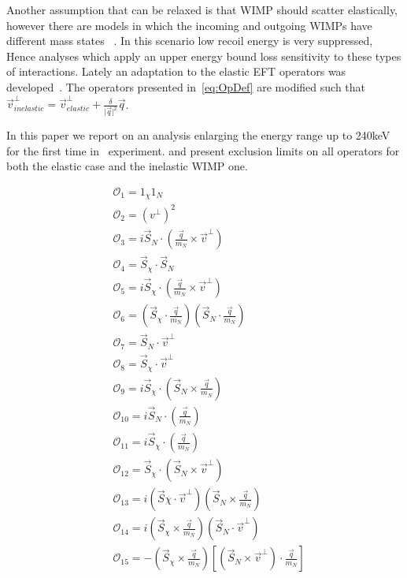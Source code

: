	    Another assumption that can be relaxed is that WIMP should scatter elastically, however there are models in which the incoming and outgoing WIMPs have different mass states ~\cite{InelasticIntro}. In this scenario low recoil energy is very suppressed, Hence analyses which apply an upper energy bound loss sensitivity to these types of interactions. Lately an adaptation to the elastic EFT operators was developed~\cite{InelasticMath}. The operators presented in~\ref{eq:OpDef} are modified such that $\vec{v}^\perp_{inelastic} = \vec{v}^\perp_{elastic} +\frac{\delta}{\vert{\vec{q}}\vert^2}\vec{q}$.      
	    
	    In this paper we report on an analysis enlarging the energy range up to 240keV for the first time in \Xehund\ experiment. and present exclusion limits on all operators for both the elastic case and the inelastic WIMP one.     

\begin{equation} \label{eq:OpDef}
\begin{split}
&\mathcal{O}_1 = 1_{\chi} 1_N  \\
&\mathcal{O}_2 = (v^{\perp})^2 \\
&\mathcal{O}_3 = i\vec{S}_N\cdot (\frac{\vec{q}}{m_N}\times\vec{v}^\perp) \\
&\mathcal{O}_4 = \vec{S}_{\chi}\cdot \vec{S}_N \\
&\mathcal{O}_5 = i\vec{S}_{\chi}\cdot (\frac{\vec{q}}{m_N}\times\vec{v}^\perp) \\
&\mathcal{O}_6 = (\vec{S}_{\chi} \cdot \frac{\vec{q}}{m_N})(\vec{S}_N \cdot \frac{\vec{q}}{m_N}) \\
&\mathcal{O}_7 = \vec{S}_N \cdot \vec{v}^\perp \\
&\mathcal{O}_8 = \vec{S}_{\chi} \cdot \vec{v}^\perp \\
&\mathcal{O}_9 = i\vec{S}_{\chi} \cdot(\vec{S}_N \times \frac{\vec{q}}{m_N}) \\
&\mathcal{O}_{10} = i\vec{S}_N \cdot (\frac{\vec{q}}{m_N}) \\
&\mathcal{O}_{11} = i\vec{S}_{\chi} \cdot (\frac{\vec{q}}{m_N}) \\
&\mathcal{O}_{12} = \vec{S}_\chi \cdot (\vec{S}_N \times \vec{v}^\perp) \\
&\mathcal{O}_{13} = i(\vec{S}\chi \cdot \vec{v}^\perp)(\vec{S}_N \times \frac{\vec{q}}{m_N})\\
&\mathcal{O}_{14} = i(\vec{S}_\chi \times \frac{\vec{q}}{m_N})(\vec{S}_N \cdot \vec{v}^\perp) \\
&\mathcal{O}_{15} = -(\vec{S}_\chi \times \frac{\vec{q}}{m_N})[(\vec{S}_N \times \vec{v}^\perp)\cdot \frac{\vec{q}}{m_N}]
\end{split}
\end{equation}
	        	       
